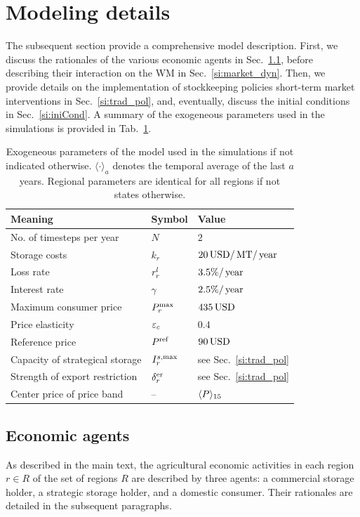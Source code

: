 \section{Modeling details}
\label{si:modDet}
The subsequent section provide a comprehensive model description. First, we discuss the rationales
of the various economic agents in Sec.~\ref{si:econAgents}, before describing their interaction on
the WM in Sec.~\ref{si:market_dyn}. Then, we provide details on the implementation of stockkeeping
policies short-term market interventions in Sec.~\ref{si:trad_pol}, and, eventually, discuss the
initial conditions in Sec.~\ref{si:iniCond}. A summary of the exogeneous parameters used in the
simulations is provided in Tab.~\ref{tab:params}.
\begin{table}[htbp]
  \caption{Exogeneous parameters of the model used in the simulations if not indicated otherwise. $\langle\cdot\rangle_a$ denotes the temporal average of the last $a$ years. Regional parameters are identical for all regions if not states otherwise.}
  \label{tab:params}
  \centering
    \begin{tabular}{lll}
      Meaning & Symbol & Value \\
      \toprule
      No. of timesteps per year & $N$ & $2$\\
      Storage costs & $k_r$ & $20\USD/\Mt/\annum$\\
      Loss rate & $r^l_r$ & $3.5\%/\annum$\\
      Interest rate & $\gamma$ & $2.5\%/\annum$\\
      Maximum consumer price & $P^{\operatorname{max}}_r$ & $435\USD$\\
      Price elasticity & $\varepsilon_c$ & $0.4$\\
      Reference price & $P^{\operatorname{ref}}$ & $90\USD$\\
      \midrule
      Capacity of strategical storage & $I^{s,\operatorname{max}}_r$ & see Sec.~\ref{si:trad_pol}\\
      Strength of export restriction & $\delta^{\operatorname{er}}_r$ & see Sec.~\ref{si:trad_pol}\\
      \midrule
      Center price of price band & -- & $\langle P \rangle_{15}$\\
      \bottomrule
    \end{tabular}
  \end{table}

\subsection{Economic agents}
\label{si:econAgents}
As described in the main text, the agricultural economic activities in each region $r\in R$
of the set of regions $R$ are described by three agents: a commercial storage holder, a
strategic storage holder, and a domestic consumer. Their rationales are detailed in the subsequent
paragraphs.

